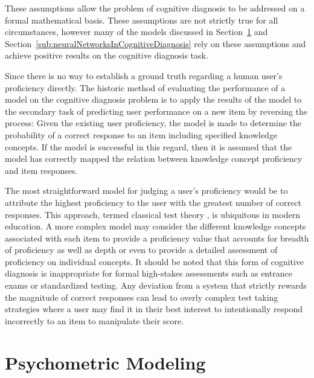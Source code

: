 \documentclass[letterpaper, 12pt, captions=tableabove]{scrreprt}
\begin{document}
		These assumptions allow the problem of cognitive diagnosis to be addressed on a formal mathematical basis. These assumptions are not strictly true for all circumstances, however many of the models discussed in Section~\ref{sec:psychometricModeling} and Section~\ref{sub:neuralNetworksInCognitiveDiagnosis} rely on these assumptions and achieve positive results on the cognitive diagnosis task. 

		Since there is no way to establish a ground truth regarding a human user's proficiency directly. The historic method of evaluating the performance of a model on the cognitive diagnosis problem is to apply the results of the model to the secondary task of predicting user performance on a new item by reversing the process: Given the existing user proficiency, the model is made to determine the probability of a correct response to an item including specified knowledge concepts. If the model is successful in this regard, then it is assumed that the model has correctly mapped the relation between knowledge concept proficiency and item responses.

		The most straightforward model for judging a user's proficiency would be to  attribute the highest proficiency to the user with the greatest number of correct responses. This approach, termed classical test theory \cite{reckase2006}, is ubiquitous in modern education. A more complex model may consider the different knowledge concepts associated with each item to provide a proficiency value that accounts for breadth of proficiency as well as depth or even to provide a detailed assessment of proficiency on individual concepts. It should be noted that this form of cognitive diagnosis is inappropriate for formal high-stakes assessments such as entrance exams or standardized testing. Any deviation from a system that strictly rewards the magnitude of correct responses can lead to overly complex test taking strategies where a user may find it in their best interest to intentionally respond incorrectly to an item to manipulate their score. 

	\section{Psychometric Modeling}
	\label{sec:psychometricModeling}
\end{document}
